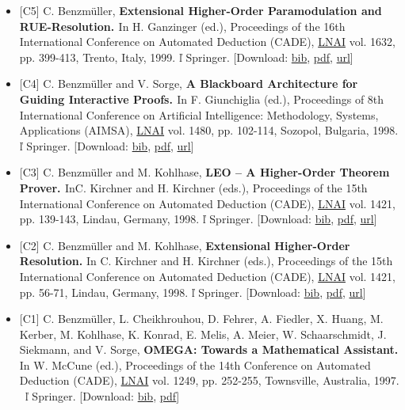 \documentclass{article}
\newcommand{\tmtextbf}[1]{{\bfseries{#1}}}
\newenvironment{itemizedot}{\begin{itemize} \renewcommand{\labelitemi}{$\bullet$}\renewcommand{\labelitemii}{$\bullet$}\renewcommand{\labelitemiii}{$\bullet$}\renewcommand{\labelitemiv}{$\bullet$}}{\end{itemize}}
\begin{document}
\begin{itemizedot}
  \item {\small [C5] C. Benzm\"uller, \tmtextbf{Extensional Higher-Order
  Paramodulation and RUE-Resolution. }In H. Ganzinger (ed.), Proceedings of
  the 16th International Conference on Automated Deduction (CADE),
  \href{http://www.springer.de/comp/lncs/}{LNAI} vol. 1632, pp. 399-413,
  Trento, Italy, 1999.  \v{l}  Springer.} {\color{grey} [Download: {\small
  \href{../papers/C5.bib}{bib}, \href{../papers/C5.pdf}{pdf}}, {\small
  \href{http://link.springer.de/link/service/series/0558/bibs/1632/16320399.htm}{url}}]}
  
  \item {\small [C4] C. Benzm\"uller and V. Sorge, \tmtextbf{A Blackboard
  Architecture for Guiding Interactive Proofs. }In F. Giunchiglia (ed.),
  Proceedings of 8th International Conference on Artificial Intelligence:
  Methodology, Systems, Applications (AIMSA),
  \href{http://www.springer.de/comp/lncs/}{LNAI} vol. 1480, pp. 102-114,
  Sozopol, Bulgaria, 1998.  \v{l}  Springer.} {\color{grey} [Download: {\small
  \href{../papers/C4.bib}{bib}, \href{../papers/C4.pdf}{pdf}}, {\small
  \href{http://link.springer.de/link/service/series/0558/bibs/1480/14800102.htm}{url}}]}
  
  \item {\small [C3] C. Benzm\"uller and M. Kohlhase, \tmtextbf{LEO -- A
  Higher-Order Theorem Prover. }In}{\small  C. Kirchner and H. Kirchner
  (eds.)}{\small , Proceedings of the 15th International Conference on
  Automated Deduction (CADE), \href{http://www.springer.de/comp/lncs/}{LNAI}
  vol. 1421, pp. 139-143, Lindau, Germany, 1998.  \v{l}  Springer.}
  {\color{grey} [Download: {\small \href{../papers/C3.bib}{bib},
  \href{../papers/C3.pdf}{pdf}}, {\small
  \href{http://link.springer.de/link/service/series/0558/bibs/1421/14210139.htm}{url}}]}
  
  \item {\small [C2] C. Benzm\"uller and M. Kohlhase, \tmtextbf{Extensional
  Higher-Order Resolution.}} {\small In} {\small C. Kirchner and H. Kirchner
  (eds.)}{\small , Proceedings of the 15th International Conference on
  Automated Deduction (CADE), \href{http://www.springer.de/comp/lncs/}{LNAI}
  vol. 1421, pp. 56-71, Lindau, Germany, 1998.  \v{l}  Springer.}
  {\color{grey} [Download: {\small \href{../papers/C2.bib}{bib},
  \href{../papers/C2.pdf}{pdf}}, {\small
  \href{http://link.springer.de/link/service/series/0558/bibs/1421/14210056.htm}{url}}]}
  
  \item {\small [C1] C. Benzm\"uller, L. Cheikhrouhou, D. Fehrer, A. Fiedler,
  X. Huang, M. Kerber, M. Kohlhase, K. Konrad, E. Melis, A. Meier, W.
  Schaarschmidt, J. Siekmann, and V. Sorge, \tmtextbf{OMEGA: Towards a
  Mathematical Assistant.}} {\small In W. McCune (ed.), Proceedings of the
  14th Conference on Automated Deduction (CADE),
  \href{http://www.springer.de/comp/lncs/}{LNAI} vol. 1249, pp. 252-255,
  Townsville, Australia, 1997. \ \v{l}  Springer.} {\color{grey} [Download:
  {\small \href{../papers/C1.bib}{bib}, \href{../papers/C1.pdf}{pdf}}]}
\end{itemizedot}
\end{document}
